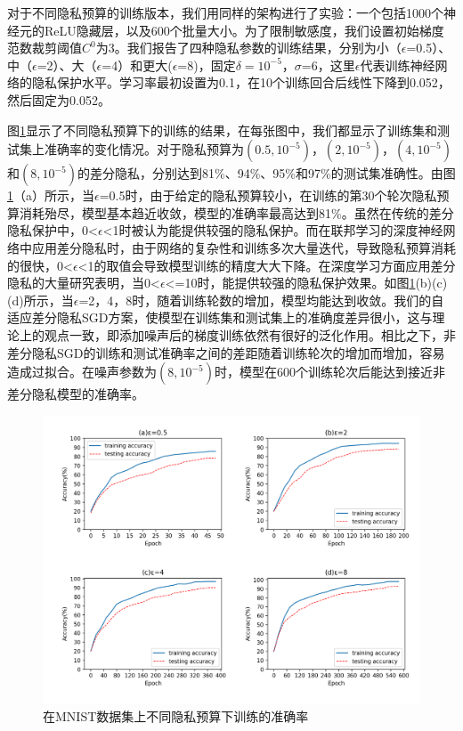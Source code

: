 对于不同隐私预算的训练版本，我们用同样的架构进行了实验：一个包括1000个神经元的ReLU隐藏层，以及600个批量大小。为了限制敏感度，我们设置初始梯度范数裁剪阈值$C^{0}$为3。我们报告了四种隐私参数的训练结果，分别为小（$\epsilon$=0.5）、中（$\epsilon$=2）、大（$\epsilon$=4）和更大($\epsilon$=8)，固定$\delta=10^{-5}$，$\sigma$=6，这里$\epsilon$代表训练神经网络的隐私保护水平。学习率最初设置为0.1，在10个训练回合后线性下降到0.052，然后固定为0.052。

图\ref{fig:在MNIST数据集上不同隐私预算下训练的准确率}显示了不同隐私预算下的训练的结果，在每张图中，我们都显示了训练集和测试集上准确率的变化情况。对于隐私预算为$\left(0.5,10^{-5}\right)$，$\left(2,10^{-5}\right)$，$\left(4,10^{-5}\right)$和$\left(8,10^{-5}\right)$的差分隐私，分别达到81\%、94\%、95\%和97\%的测试集准确性。由图\ref{fig:在MNIST数据集上不同隐私预算下训练的准确率}（a）所示，当$\epsilon$=0.5时，由于给定的隐私预算较小，在训练的第30个轮次隐私预算消耗殆尽，模型基本趋近收敛，模型的准确率最高达到81\%。虽然在传统的差分隐私保护中，0<$\epsilon$<1时被认为能提供较强的隐私保护。而在联邦学习的深度神经网络中应用差分隐私时，由于网络的复杂性和训练多次大量迭代，导致隐私预算消耗的很快，0<$\epsilon$<1的取值会导致模型训练的精度大大下降。在深度学习方面应用差分隐私的大量研究表明，当0<$\epsilon$<=10时，能提供较强的隐私保护效果。如图\ref{fig:在MNIST数据集上不同隐私预算下训练的准确率}(b)(c)(d)所示，当$\epsilon$=2，4，8时，随着训练轮数的增加，模型均能达到收敛。我们的自适应差分隐私SGD方案，使模型在训练集和测试集上的准确度差异很小，这与理论上的观点一致，即添加噪声后的梯度训练依然有很好的泛化作用。相比之下，非差分隐私SGD的训练和测试准确率之间的差距随着训练轮次的增加而增加，容易造成过拟合。在噪声参数为$\left(8,10^{-5}\right)$时，模型在600个训练轮次后能达到接近非差分隐私模型的准确率。

\begin{figure}[!hbt]
\centering
	\includegraphics[scale=0.6]{fig2/C3/第三章实验一2}%
	\caption{在MNIST数据集上不同隐私预算下训练的准确率}
	\label{fig:在MNIST数据集上不同隐私预算下训练的准确率}	
\end{figure}

